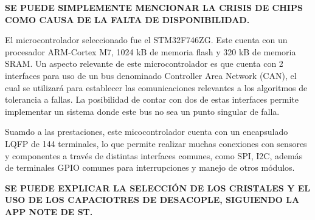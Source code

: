 \textbf{{\color{red} SE PUEDE SIMPLEMENTE MENCIONAR LA CRISIS DE CHIPS COMO CAUSA DE LA FALTA DE DISPONIBILIDAD.}}

El microcontrolador seleccionado fue el STM32F746ZG. Este cuenta con un procesador ARM-Cortex M7, 1024 kB de memoria flash y 320 kB de memoria SRAM. Un aspecto relevante de este microcontrolador es que cuenta con 2 interfaces para uso de un bus denominado Controller Area Network (CAN), el cual se utilizará para establecer las comunicaciones relevantes a los algoritmos de tolerancia a fallas. La posibilidad de contar con dos de estas interfaces permite implementar un sistema donde este bus no sea un punto singular de falla.

Suamdo a las prestaciones, este micocontrolador cuenta con un encapsulado LQFP de 144 terminales, lo que permite realizar muchas conexiones con sensores y componentes a través de distintas interfaces comunes, como SPI, I2C, además de terminales GPIO comunes para interrupciones y manejo de otros módulos.

\textbf{{\color{red} SE PUEDE EXPLICAR LA SELECCIÓN DE LOS CRISTALES Y EL USO DE LOS CAPACIOTRES DE DESACOPLE, SIGUIENDO LA APP NOTE DE ST.}}











